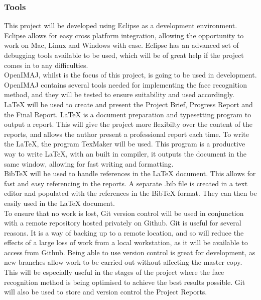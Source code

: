 \documentclass[12pt, a4paper]{article}
\begin{document}
\subsubsection{Tools} 
This project will be developed using Eclipse as a development environment. Eclipse allows for easy cross platform integration, allowing the opportunity to work on Mac, Linux and Windows with ease. Eclipse has an advanced set of debugging tools available to be used, which will be of great help if the project comes in to any difficulties.\\ 
OpenIMAJ, whilst is the focus of this project, is going to be used in development. OpenIMAJ contains several tools needed for implementing the face recognition method, and they will be tested to ensure suitability and used accordingly. \\
\LaTeX{} will be used to create and present the Project Brief, Progress Report and the Final Report. \LaTeX{} is a document preparation and typesetting program to output a report. This will give the project more flexibilty over the content of the reports, and allows the author present a professional report each time. To write the \LaTeX{}, the program TexMaker will be used. This program is a productive way to write \LaTeX{}, with an built in compiler, it outputs the document in the same window, allowing for fast writing and formatting.\\
BibTeX will be used to handle references in the \LaTeX{} document. This allows for fast and easy referencing in the reports. A separate .bib file is created in a text editor and populated with the references in the BibTeX format. They can then be easily used in the \LaTeX{} document.\\
To ensure that no work is lost, Git version control will be used in conjunction with a remote repository hosted privately on Github. Git is useful for several reasons. It is a way of backing up to a remote location, and so will reduce the effects of a large loss of work from a local workstation, as it will be available to access from Github. Being able to use version control is great for development, as new branches allow work to be carried out without affecting the master copy. This will be especially useful in the stages of the project where the face recognition method is being optimised to achieve the best results possible. Git will also be used to store and version control the Project Reports.
\end{document}
